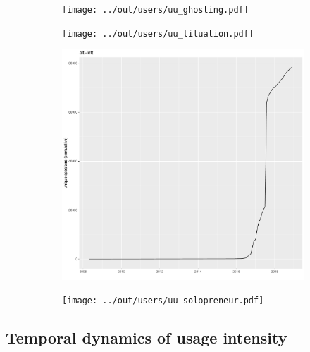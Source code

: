 \documentclass[a4paper]{scrartcl}
\begin{document}
    \begin{figure}[H]
      \caption{Cumulative frequency counts for case study words.}
      \centering
      \begin{subfigure}{.45\linewidth}
        \caption{}
        \centering
        \texttt{[image: ../out/users/uu\_ghosting.pdf]}
      \end{subfigure}
      \begin{subfigure}{.45\linewidth}
        \caption{}
        \centering
        \texttt{[image: ../out/users/uu\_lituation.pdf]}
      \end{subfigure}

      \begin{subfigure}{.45\linewidth}
        \caption{}
        \centering
        \includegraphics[width=\linewidth, height=.8\textheight, keepaspectratio]{../out/users/uu_alt-left.pdf}
      \end{subfigure}
      \begin{subfigure}{.45\linewidth}
        \caption{}
        \centering
        \texttt{[image: ../out/users/uu\_solopreneur.pdf]}
      \end{subfigure}
    \end{figure}

  \subsection{Temporal dynamics of usage intensity}
\end{document}

